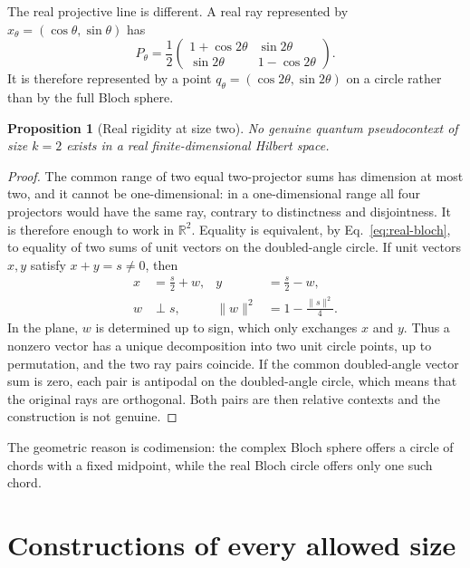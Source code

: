 \documentclass[
  twocolumn,
  aps,
  pra,
  floatfix,
  amsmath,amssymb,
  longbibliography
]{revtex4-2}
\newtheorem{proposition}[theorem]{Proposition}
\theoremstyle{definition}
\theoremstyle{remark}
\newcommand{\R}{\mathbb R}
\newcommand{\1}{\mathbf 1}
\begin{document}
The real projective line is different.  A real ray represented by
$x_\theta=(\cos\theta,\sin\theta)$ has
\begin{equation}
 P_\theta=\frac12
 \begin{pmatrix}
 1+\cos2\theta&\sin2\theta\\
 \sin2\theta&1-\cos2\theta
 \end{pmatrix}.
 \label{eq:real-bloch}
\end{equation}
It is therefore represented by a point
$q_\theta=(\cos2\theta,\sin2\theta)$ on a circle rather than by the full
Bloch sphere.

\begin{proposition}[Real rigidity at size two]
\label{prop:real-k2}
No genuine quantum pseudocontext of size $k=2$ exists in a real
finite-dimensional Hilbert space.
\end{proposition}

\begin{proof}
The common range of two equal two-projector sums has dimension at most two,
and it cannot be one-dimensional: in a one-dimensional range all four
projectors would have the same ray, contrary to distinctness and
disjointness.  It is therefore enough to work in $\R^2$.  Equality is
equivalent, by Eq.~\eqref{eq:real-bloch}, to equality of two sums of unit
vectors on the doubled-angle circle.  If unit vectors $x,y$ satisfy
$x+y=s\ne0$, then
\[
 \begin{aligned}
 x&=\frac{s}{2}+w,& y&=\frac{s}{2}-w,\\
 w&\perp s,& \|w\|^2&=1-\frac{\|s\|^2}{4}.
 \end{aligned}
\]
In the plane, $w$ is determined up to sign, which only exchanges $x$ and
$y$.  Thus a nonzero vector has a unique decomposition into two unit circle
points, up to permutation, and the two ray pairs coincide.  If
the common doubled-angle vector sum is zero, each pair is antipodal on the
doubled-angle circle, which means that the original rays are orthogonal.  Both
pairs are then relative contexts and the construction is not genuine.
\end{proof}

The geometric reason is codimension: the complex Bloch sphere offers a circle
of chords with a fixed midpoint, while the real Bloch circle offers only one
such chord.

\section{Constructions of every allowed size}
\label{sec:all-sizes}
\end{document}
